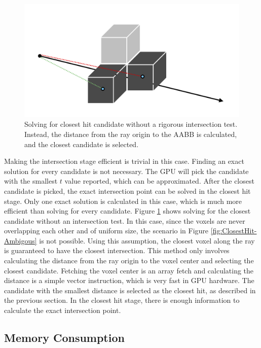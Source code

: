 \documentclass[12pt]{article}
\begin{document}
\begin{figure}[H]
    \begin{center}
        \includegraphics[scale=0.22]{ClosestHit-Approx}
    \end{center}
    \caption{
        Solving for closest hit candidate without a rigorous intersection test.
        Instead, the distance from the ray origin to the AABB is calculated, and the closest candidate is selected.
    }
    \label{fig:ClosestHit-Approx}
\end{figure}

Making the intersection stage efficient is trivial in this case.
Finding an exact solution for every candidate is not necessary.
The GPU will pick the candidate with the smallest $t$ value reported, which can be approximated.
After the closest candidate is picked, the exact intersection point can be solved in the closest hit stage.
Only one exact solution is calculated in this case, which is much more efficient than solving for every candidate.
Figure \ref{fig:ClosestHit-Approx} shows solving for the closest candidate without an intersection test.
In this case, since the voxels are never overlapping each other and of uniform size, the scenario in Figure \ref{fig:ClosestHit-Ambigous} is not possible.
Using this assumption, the closest voxel along the ray is guaranteed to have the closest intersection.
This method only involves calculating the distance from the ray origin to the voxel center and selecting the closest candidate.
Fetching the voxel center is an array fetch and calculating the distance is a simple vector instruction, which is very fast in GPU hardware.
The candidate with the smallest distance is selected as the closest hit, as described in the previous section.
In the closest hit stage, there is enough information to calculate the exact intersection point.

\subsection{Memory Consumption}
\end{document}
